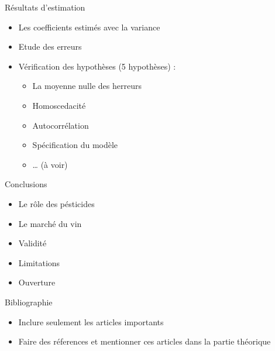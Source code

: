 \documentclass[11pt,ignorenonframetext,]{beamer}
\providecommand{\tightlist}{%
  \setlength{\itemsep}{0pt}\setlength{\parskip}{0pt}}
\begin{document}
\begin{frame}{Résultats d'estimation}
\protect\hypertarget{resultats-destimation}{}

\begin{itemize}
\tightlist
\item
  Les coefficients estimés avec la variance
\item
  Etude des erreurs
\item
  Vérification des hypothèses (5 hypothèses) :

  \begin{itemize}
  \tightlist
  \item
    La moyenne nulle des herreurs
  \item
    Homoscedacité
  \item
    Autocorrélation
  \item
    Spécification du modèle
  \item
    \ldots{} (à voir)
  \end{itemize}
\end{itemize}

\end{frame}

\begin{frame}{Conclusions}
\protect\hypertarget{conclusions}{}

\begin{itemize}
\tightlist
\item
  Le rôle des pésticides
\item
  Le marché du vin
\item
  Validité
\item
  Limitations
\item
  Ouverture
\end{itemize}

\end{frame}

\begin{frame}{Bibliographie}
\protect\hypertarget{bibliographie}{}

\begin{itemize}
\tightlist
\item
  Inclure seulement les articles importants
\item
  Faire des réferences et mentionner ces articles dans la partie
  théorique
\end{itemize}

\end{frame}
\end{document}
